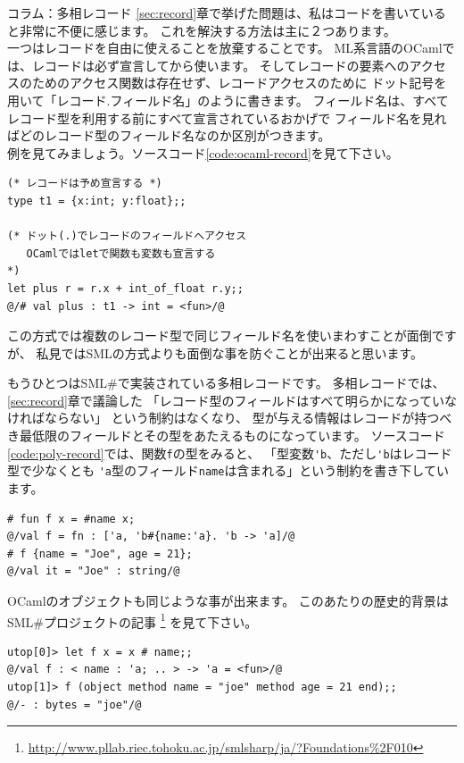 \documentclass[11pt,a4paper]{article}
\begin{document}
\begin{itembox}[l]{コラム：多相レコード}
  \ref{sec:record}章で挙げた問題は、私はコードを書いていると非常に不便に感じます。
  これを解決する方法は主に２つあります。\\
  一つはレコードを自由に使えることを放棄することです。
  ML系言語のOCaml\cite{ocaml}では、レコードは必ず宣言してから使います。
  そしてレコードの要素へのアクセスのためのアクセス関数は存在せず、レコードアクセスのために
  ドット記号を用いて「レコード.フィールド名」のように書きます。
  フィールド名は、すべてレコード型を利用する前にすべて宣言されているおかげで
  フィールド名を見ればどのレコード型のフィールド名なのか区別がつきます。\\
  例を見てみましょう。ソースコード\ref{code:ocaml-record}を見て下さい。

\begin{lstlisting}[caption=OCamlにおけるレコード,label=code:ocaml-record]
(* レコードは予め宣言する *)
type t1 = {x:int; y:float};;

(* ドット(.)でレコードのフィールドへアクセス
   OCamlではletで関数も変数も宣言する
*)
let plus r = r.x + int_of_float r.y;;
@/# val plus : t1 -> int = <fun>/@
\end{lstlisting}

  この方式では複数のレコード型で同じフィールド名を使いまわすことが面倒ですが、
  私見ではSMLの方式よりも面倒な事を防ぐことが出来ると思います。

  もうひとつはSML\#\cite{smlsharp}で実装されている多相レコードです。
  多相レコードでは、\ref{sec:record}章で議論した
 「レコード型のフィールドはすべて明らかになっていなければならない」
  という制約はなくなり、
  型が与える情報はレコードが持つべき最低限のフィールドとその型をあたえるものになっています。
  ソースコード\ref{code:poly-record}では、関数\lstinline{f}の型をみると、
  「型変数\lstinline{'b}、ただし\lstinline{'b}はレコード型で少なくとも
  \lstinline{'a}型のフィールド\lstinline{name}は含まれる」という制約を書き下しています。

\begin{lstlisting}[caption=SML\#の多相レコード,label=code:poly-record]
# fun f x = #name x;
@/val f = fn : ['a, 'b#{name:'a}. 'b -> 'a]/@
# f {name = "Joe", age = 21};
@/val it = "Joe" : string/@
\end{lstlisting}

  OCamlのオブジェクトも同じような事が出来ます。
  このあたりの歴史的背景はSML\#プロジェクトの記事  \footnote{\url{http://www.pllab.riec.tohoku.ac.jp/smlsharp/ja/?Foundations\%2F010}}
  を見て下さい。

\begin{lstlisting}[caption=OCamlのオブジェクト,label=code:ocaml-obj]
utop[0]> let f x = x # name;;
@/val f : < name : 'a; .. > -> 'a = <fun>/@
utop[1]> f (object method name = "joe" method age = 21 end);;
@/- : bytes = "joe"/@
\end{lstlisting}

\end{itembox}
\end{document}
